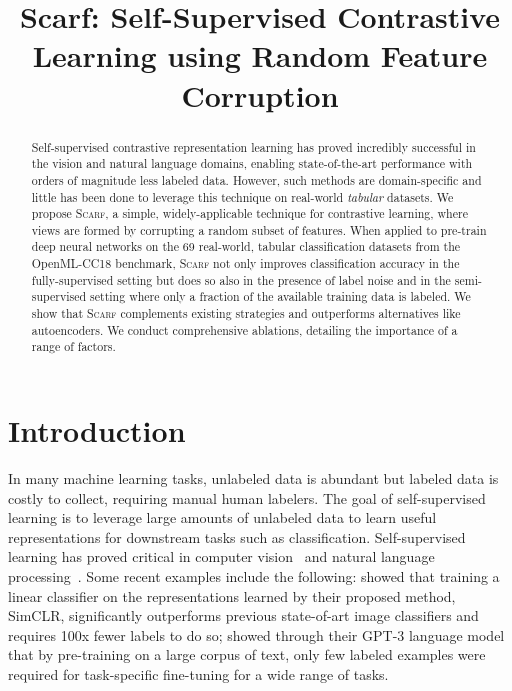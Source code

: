 \title{Scarf: Self-Supervised Contrastive Learning using Random Feature Corruption}

\begin{abstract}
Self-supervised contrastive representation learning has proved incredibly successful in the vision and natural language domains, enabling state-of-the-art performance with orders of magnitude less labeled data. However, such methods are domain-specific and little has been done to leverage this technique on real-world \emph{tabular} datasets. We propose \textsc{Scarf}, a simple, widely-applicable technique for contrastive learning, where views are formed by corrupting a random subset of features. When applied to pre-train deep neural networks on the 69 real-world, tabular classification datasets from the OpenML-CC18 benchmark, \textsc{Scarf} not only improves classification accuracy in the fully-supervised setting but does so also in the presence of label noise and in the semi-supervised setting where only a fraction of the available training data is labeled. We show that \textsc{Scarf} complements existing strategies and outperforms alternatives like autoencoders. We conduct comprehensive ablations, detailing the importance of a range of factors.
\end{abstract}

\section{Introduction}

In many machine learning tasks, unlabeled data is abundant but labeled data is costly to collect, requiring manual human labelers. The goal of self-supervised learning is to leverage large amounts of unlabeled data to learn useful representations for downstream tasks such as classification. Self-supervised learning has proved critical in computer vision~\citep{grill2020bootstrap,misra2020self,he2020momentum,tian2019contrastive} and natural language processing~\citep{song2020mpnet,wang2019denoising,raffel2019exploring}. Some recent examples include the following: \citet{chen2020simple} showed that training a linear classifier on the representations learned by their proposed method, SimCLR, significantly outperforms previous state-of-art image classifiers and requires 100x fewer labels to do so; \citet{brown2020language} showed through their GPT-3 language model that by pre-training on a large corpus of text, only few labeled examples were required for task-specific fine-tuning for a wide range of tasks.

